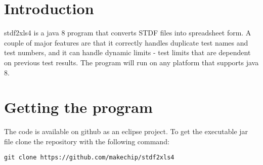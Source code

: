 \documentclass[letterpaper]{article}
\begin{document}
\selectfont
\newcommand{\tfont}{\usefont{T1}{ua1}{m}{n}\selectfont\footnotesize}
\newcommand{\bfont}{\usefont{T1}{ua1}{b}{n}\selectfont\tiny}
\newcommand{\xfont}{\usefont{T1}{ua1}{m}{n}\selectfont\scriptsize}
\newcommand{\lfont}{\usefont{T1}{ua1}{m}{n}\selectfont\large}
\newcommand{\device}{ADC0801}
\renewcommand{\captionfont}{\it }
\renewcommand{\date}{February 26, 2017}
\newcommand{\ver}{V1.0}
\newcommand{\tablecap}{\hline\end{tabular}\end{table}\end{center}}
\renewcommand{\versionhistory}{
\vspace*{1in}
\begin{center}
\begin{table}[H]\caption*{Revision History}
\centering
\xfont\begin{tabular}[H]{|c|c|c|c|}
\hline
{\bf Version} & {\bf Author} & {\bf Date} & {\bf Changes}\\
\hline
\hline
1.0 & Eric West & 2/26/17 & Update to stdf2xls4 version 4.1.2 \\
\hline
\end{tabular}
\end{table}
\end{center}
}
\maketitle
\setcounter{tocdepth}{2}
\tableofcontents
\clearpage
\makebg

\section{Introduction}
stdf2xls4 is a java 8 program that converts STDF files into spreadsheet form.  A couple of major 
features are that it correctly handles duplicate test names and test numbers, and it can handle
dynamic limits - test limits that are dependent on previous test results.  The program will
run on any platform that supports java 8.

\section{Getting the program}

The code is available on github as an eclipse project.  To get the executable jar file
clone the repository with the following command:
\begin{verbatim}
git clone https://github.com/makechip/stdf2xls4
\end{verbatim}
\end{document}
